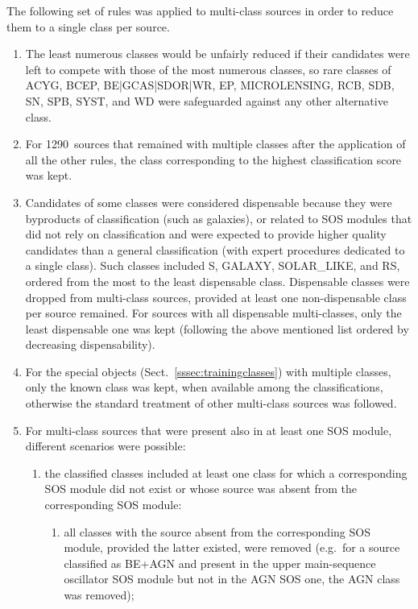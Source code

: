 \documentclass[longauth]{aa}
\begin{document}
The following set of rules was applied to multi-class sources in order to reduce them to a single class per source.
\begin{enumerate}
    \item The least numerous classes would be unfairly reduced if their candidates were left to compete with those of the most numerous classes, so rare classes of ACYG, BCEP, BE|GCAS|SDOR|WR, EP, MICROLENSING, RCB, SDB, SN, SPB, SYST, and WD were safeguarded against any other alternative class. 
    \item\label{item:score-xm} For 1290~sources that remained with multiple classes after the application of all the other rules, the class corresponding to the highest classification score was kept. 
    \item Candidates of some classes were considered dispensable because they were byproducts of classification (such as galaxies), or related to SOS modules that did not rely on classification and were expected to provide higher quality candidates than a general classification (with expert procedures dedicated to a single class). Such classes included S, GALAXY, SOLAR\_LIKE, and RS, ordered from the most to the least dispensable class. 
    Dispensable classes were dropped from multi-class sources, provided at least one non-dispensable class per source remained. For sources with all dispensable multi-classes, only the least dispensable one was kept (following the above mentioned list ordered by decreasing dispensability).
    \item For the special objects (Sect.~\ref{sssec:trainingclasses}) with multiple classes, only the known class was kept, when available among the classifications, otherwise the standard treatment of other multi-class sources was followed.
\item For multi-class sources that were present also in at least one SOS module, different scenarios were possible: 
  \begin{enumerate}
        \item the classified classes included at least one class for which a corresponding SOS module did not exist or whose source was absent from the corresponding SOS module: 
        \begin{enumerate}
           \item all classes with the source absent from the corresponding SOS module, provided the latter existed, were removed
       (e.g.\ for a source classified as BE+AGN and present in the upper main-sequence oscillator SOS module but not in the AGN SOS one, the AGN class was removed);

\end{enumerate}
\end{enumerate}
\end{enumerate}
\end{document}
